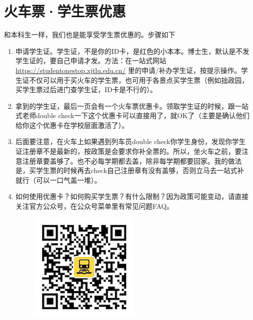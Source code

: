 \section{火车票·学生票优惠}

和本科生一样，我们也是能享受学生票优惠的。步骤如下

\begin{enumerate}
    \item 申请学生证。学生证，不是你的ID卡，是红色的小本本。博士生，默认是不发学生证的，要自己申请才发。方法：在一站式网站 \url{https://studentonestop.xjtlu.edu.cn/} 里的申请/补办学生证，按提示操作。学生证不仅可以用于买火车的学生票，也可用于各景点买学生票（例如拙政园，买学生票过后进门查学生证，ID卡是不行的）。
    \item 拿到的学生证，最后一页会有一个火车票优惠卡。领取学生证的时候，跟一站式老师double check一下这个优惠卡可以直接用了，就OK了（主要是确认他们给你这个优惠卡在学校层面激活了）。
    \item 后面要注意，在火车上如果遇到列车员double check你学生身份，发现你学生证注册章不是最新的，按政策是会要求你补全票的。所以，坐火车之前，要注意注册章要盖够了。也不必每学期都去盖，除非每学期都要回家。我的做法是，买学生票的时候再去check自己注册章有没有盖够，否则立马去一站式补就行（可以一口气盖一堆）。
    \item 
        \begin{minipage}{0.71\textwidth}
            如何使用优惠卡？如何购买学生票？有什么限制？因为政策可能变动，请直接关注官方公众号，在公众号菜单里有常见问题FAQ。
        \end{minipage}
        \begin{minipage}{0.2\textwidth}
            \begin{figure}[H]
                \includegraphics[width=0.95\columnwidth, center]{author-folder/Kai.Wu/qrcode_huitongstudent_1.jpg}
            \end{figure}
        \end{minipage}

\end{enumerate}


